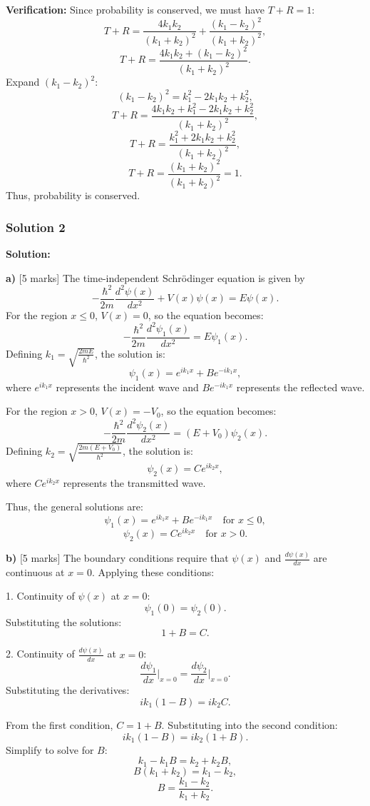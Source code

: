 \documentclass{article}
\begin{document}
\textbf{Verification:} Since probability is conserved, we must have $T + R = 1$:
\[
T + R = \frac{4k_1k_2}{(k_1 + k_2)^2} + \frac{(k_1 - k_2)^2}{(k_1 + k_2)^2},
\]
\[
T + R = \frac{4k_1k_2 + (k_1 - k_2)^2}{(k_1 + k_2)^2}.
\]
Expand $(k_1 - k_2)^2$:
\[
(k_1 - k_2)^2 = k_1^2 - 2k_1k_2 + k_2^2,
\]
\[
T + R = \frac{4k_1k_2 + k_1^2 - 2k_1k_2 + k_2^2}{(k_1 + k_2)^2},
\]
\[
T + R = \frac{k_1^2 + 2k_1k_2 + k_2^2}{(k_1 + k_2)^2},
\]
\[
T + R = \frac{(k_1 + k_2)^2}{(k_1 + k_2)^2} = 1.
\]
Thus, probability is conserved.


\subsubsection{Solution 2}
\textbf{Solution:}

\textbf{a)} [5 marks]  
The time-independent Schrödinger equation is given by  
\[
-\frac{\hbar^2}{2m} \frac{d^2 \psi(x)}{dx^2} + V(x)\psi(x) = E\psi(x).
\]  
For the region $x \leq 0$, $V(x) = 0$, so the equation becomes:  
\[
-\frac{\hbar^2}{2m} \frac{d^2 \psi_1(x)}{dx^2} = E\psi_1(x).
\]  
Defining $k_1 = \sqrt{\frac{2mE}{\hbar^2}}$, the solution is:  
\[
\psi_1(x) = e^{ik_1x} + Be^{-ik_1x},
\]  
where $e^{ik_1x}$ represents the incident wave and $Be^{-ik_1x}$ represents the reflected wave.  

For the region $x > 0$, $V(x) = -V_0$, so the equation becomes:  
\[
-\frac{\hbar^2}{2m} \frac{d^2 \psi_2(x)}{dx^2} = (E + V_0)\psi_2(x).
\]  
Defining $k_2 = \sqrt{\frac{2m(E+V_0)}{\hbar^2}}$, the solution is:  
\[
\psi_2(x) = Ce^{ik_2x},
\]  
where $Ce^{ik_2x}$ represents the transmitted wave.  

Thus, the general solutions are:  
\[
\psi_1(x) = e^{ik_1x} + Be^{-ik_1x} \quad \text{for } x \leq 0,
\]  
\[
\psi_2(x) = Ce^{ik_2x} \quad \text{for } x > 0.
\]  

\textbf{b)} [5 marks]  
The boundary conditions require that $\psi(x)$ and $\frac{d\psi(x)}{dx}$ are continuous at $x = 0$. Applying these conditions:  

1. Continuity of $\psi(x)$ at $x = 0$:  
\[
\psi_1(0) = \psi_2(0).
\]  
Substituting the solutions:  
\[
1 + B = C.
\]  

2. Continuity of $\frac{d\psi(x)}{dx}$ at $x = 0$:  
\[
\frac{d\psi_1}{dx}\Big|_{x=0} = \frac{d\psi_2}{dx}\Big|_{x=0}.
\]  
Substituting the derivatives:  
\[
ik_1(1 - B) = ik_2C.
\]  

From the first condition, $C = 1 + B$. Substituting into the second condition:  
\[
ik_1(1 - B) = ik_2(1 + B).
\]  
Simplify to solve for $B$:  
\[
k_1 - k_1B = k_2 + k_2B,
\]  
\[
B(k_1 + k_2) = k_1 - k_2,
\]  
\[
B = \frac{k_1 - k_2}{k_1 + k_2}.
\]  
\end{document}
